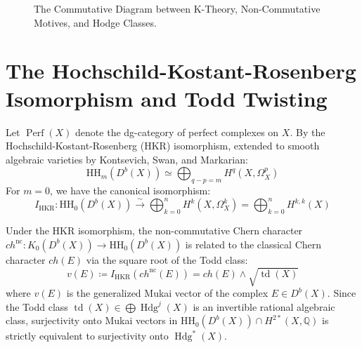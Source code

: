 \documentclass[11pt,a4paper]{article}
\theoremstyle{definition}
\begin{document}
\begin{figure}[htbp]
\centering
{}
\caption{The Commutative Diagram between K-Theory, Non-Commutative Motives, and Hodge Classes.}
\label{fig:derived_hkr}
\end{figure}

\section{The Hochschild-Kostant-Rosenberg Isomorphism and Todd Twisting}
Let $\operatorname{Perf}(X)$ denote the dg-category of perfect complexes on $X$.
By the Hochschild-Kostant-Rosenberg (HKR) isomorphism, extended to smooth algebraic varieties by Kontsevich, Swan, and Markarian:
\begin{equation}
\mathrm{HH}_m(D^b(X)) \simeq \bigoplus_{q - p = m} H^q(X, \Omega_X^p)
\end{equation}
For $m = 0$, we have the canonical isomorphism:
\begin{equation}
I_{\mathrm{HKR}} : \mathrm{HH}_0(D^b(X)) \xrightarrow{\;\sim\;} \bigoplus_{k=0}^n H^k(X, \Omega_X^k) = \bigoplus_{k=0}^n H^{k,k}(X)
\end{equation}

Under the HKR isomorphism, the non-commutative Chern character $ch^{\mathrm{nc}} : K_0(D^b(X)) \to \mathrm{HH}_0(D^b(X))$ is related to the classical Chern character $ch(E)$ via the square root of the Todd class:
\begin{equation}
v(E) \coloneqq I_{\mathrm{HKR}}(ch^{\mathrm{nc}}(E)) = ch(E) \wedge \sqrt{\operatorname{td}(X)}
\end{equation}
where $v(E)$ is the generalized Mukai vector of the complex $E \in D^b(X)$.
Since the Todd class $\operatorname{td}(X) \in \bigoplus \operatorname{Hdg}^j(X)$ is an invertible rational algebraic class, surjectivity onto Mukai vectors in $\mathrm{HH}_0(D^b(X)) \cap H^{2*}(X, \mathbb{Q})$ is strictly equivalent to surjectivity onto $\operatorname{Hdg}^*(X)$.
\end{document}
